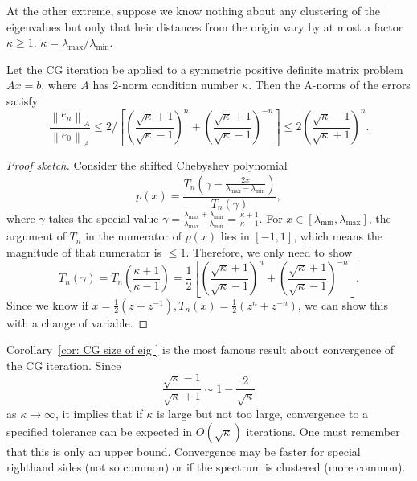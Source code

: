 At the other extreme, suppose we know nothing about any clustering of the eigenvalues but only that heir distances from the origin vary by at most a factor $ \kappa \ge 1 $. $ \kappa = \lambda _{\max} /  \lambda _{ \min }$. 


\begin{corollary}
\label{cor: CG size of eig }
Let the CG iteration be applied to a symmetric positive definite matrix problem $A x=b$, where $A$ has 2-norm condition number $\kappa$. Then the A-norms of the errors satisfy
$$
\frac{\left\|e_n\right\|_A}{\left\|e_0\right\|_A} \leq 2 /\left[\left(\frac{\sqrt{\kappa}+1}{\sqrt{\kappa}-1}\right)^n+\left(\frac{\sqrt{\kappa}+1}{\sqrt{\kappa}-1}\right)^{-n}\right] \leq 2\left(\frac{\sqrt{\kappa}-1}{\sqrt{\kappa}+1}\right)^n. 
$$
\end{corollary}
\begin{proof}[Proof sketch]
Consider the shifted Chebyshev polynomial 
\[
    p(x) = \frac{T_n\left (\gamma  - \frac{2x}{\lambda_{\max} - \lambda _{\min}}\right )}{T_n(\gamma )},
\]
where $ \gamma  $ takes the special value $ \gamma = \frac{\lambda _{\max} + \lambda _{\min}}{\lambda _{\max}-\lambda _{\min}} = \frac{\kappa+1}{\kappa-1} $. For $ x\in [\lambda _{\min}, \lambda _{\max}] $, the argument of $ T_n $ in the numerator of $ p(x) $ lies in $ [-1,1] $, which means the magnitude of that numerator is $ \le 1 $. Therefore, we only need to show 
\[
    T_n(\gamma)=T_n\left(\frac{\kappa+1}{\kappa-1}\right)=\frac{1}{2}\left[\left(\frac{\sqrt{\kappa}+1}{\sqrt{\kappa}-1}\right)^n+\left(\frac{\sqrt{\kappa}+1}{\sqrt{\kappa}-1}\right)^{-n}\right] .
\]
Since we know if $ x= \frac{1}{2}(z + z^{-1} ), T_n(x) = \frac{1}{2}(z^{n} + z^{-n}) $, we can show this with a change of variable.  
\end{proof}

Corollary~\ref{cor: CG size of eig } is the most famous result about convergence of the CG iteration. Since
$$
\frac{\sqrt{\kappa}-1}{\sqrt{\kappa}+1} \sim 1-\frac{2}{\sqrt{\kappa}}
$$
as $\kappa \rightarrow \infty$, it implies that if $\kappa$ is large but not too large, convergence to a specified tolerance can be expected in $O(\sqrt{\kappa})$ iterations. One must remember that this is only an upper bound. Convergence may be faster for special righthand sides (not so common) or if the spectrum is clustered (more common).

